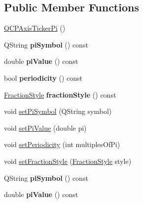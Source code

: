 \subsection*{Public Member Functions}
\begin{DoxyCompactItemize}
\item 
\hyperlink{class_q_c_p_axis_ticker_pi_aa0d7b7034055927c0f0077a2d713d7d0}{Q\+C\+P\+Axis\+Ticker\+Pi} ()
\item 
Q\+String {\bfseries pi\+Symbol} () const \hypertarget{class_q_c_p_axis_ticker_pi_aaf27b8fc9436c4682cc03a247898600f}{}\label{class_q_c_p_axis_ticker_pi_aaf27b8fc9436c4682cc03a247898600f}

\item 
double {\bfseries pi\+Value} () const \hypertarget{class_q_c_p_axis_ticker_pi_a536127262e22ecbc3b672b6f9478cd98}{}\label{class_q_c_p_axis_ticker_pi_a536127262e22ecbc3b672b6f9478cd98}

\item 
bool {\bfseries periodicity} () const \hypertarget{class_q_c_p_axis_ticker_pi_adc440aa474152b8a5b263456f45b5338}{}\label{class_q_c_p_axis_ticker_pi_adc440aa474152b8a5b263456f45b5338}

\item 
\hyperlink{class_q_c_p_axis_ticker_pi_a262f1534c7f0c79a7d5237f5d1e2c54c}{Fraction\+Style} {\bfseries fraction\+Style} () const \hypertarget{class_q_c_p_axis_ticker_pi_a517f2e93f64d8bbadd96d4045ac81f2a}{}\label{class_q_c_p_axis_ticker_pi_a517f2e93f64d8bbadd96d4045ac81f2a}

\item 
void \hyperlink{class_q_c_p_axis_ticker_pi_acfdcd4758a393bde4be12a50fb2017b5}{set\+Pi\+Symbol} (Q\+String symbol)
\item 
void \hyperlink{class_q_c_p_axis_ticker_pi_a36ce0651d2ec92edd36feac1619c2468}{set\+Pi\+Value} (double pi)
\item 
void \hyperlink{class_q_c_p_axis_ticker_pi_a58f538dc01860fb56e46970e28a87f03}{set\+Periodicity} (int multiples\+Of\+Pi)
\item 
void \hyperlink{class_q_c_p_axis_ticker_pi_a760c8af6ca68178e607556c4e5049d71}{set\+Fraction\+Style} (\hyperlink{class_q_c_p_axis_ticker_pi_a262f1534c7f0c79a7d5237f5d1e2c54c}{Fraction\+Style} style)
\item 
Q\+String {\bfseries pi\+Symbol} () const \hypertarget{class_q_c_p_axis_ticker_pi_aaf27b8fc9436c4682cc03a247898600f}{}\label{class_q_c_p_axis_ticker_pi_aaf27b8fc9436c4682cc03a247898600f}

\item 
double {\bfseries pi\+Value} () const \hypertarget{class_q_c_p_axis_ticker_pi_a536127262e22ecbc3b672b6f9478cd98}{}\label{class_q_c_p_axis_ticker_pi_a536127262e22ecbc3b672b6f9478cd98}


\end{DoxyCompactItemize}
